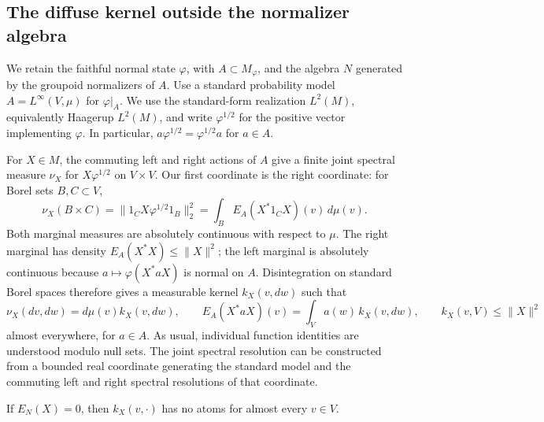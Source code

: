 \subsection{The diffuse kernel outside the normalizer algebra}
We retain the faithful normal state $\varphi$, with $A\subset M_\varphi$,
and the algebra $N$ generated by the groupoid normalizers of $A$.
Use a standard probability model $A=L^\infty(V,\mu)$ for
$\varphi|_A$.  We use the standard-form realization $L^2(M)$, equivalently
Haagerup $L^2(M)$, and write $\varphi^{1/2}$ for the positive vector
implementing $\varphi$.  In particular,
$a\varphi^{1/2}=\varphi^{1/2}a$ for $a\in A$.

For $X\in M$, the commuting left and right actions of $A$ give a finite
joint spectral measure $\nu_X$ for $X\varphi^{1/2}$ on $V\times V$.
Our first coordinate is the right coordinate: for Borel sets $B,C\subset V$,
\begin{equation}\label{exp:joint-measure}
 \nu_X(B\times C)
 =\big\|1_CX\varphi^{1/2}1_B\big\|_2^2
 =\int_B E_A(X^*1_CX)(v)\,d\mu(v).
\end{equation}
Both marginal measures are absolutely continuous with respect to $\mu$.
The right marginal has density $E_A(X^*X)\leq\|X\|^2$; the left marginal
is absolutely continuous because $a\mapsto\varphi(X^*aX)$ is normal on
$A$.  Disintegration on standard Borel spaces therefore gives a measurable
kernel $k_X(v,dw)$ such that
\begin{equation}\label{exp:kernel}
 \nu_X(dv,dw)=d\mu(v)k_X(v,dw),\qquad
 E_A(X^*aX)(v)=\int_V a(w)\,k_X(v,dw),\qquad
 k_X(v,V)\leq\|X\|^2
\end{equation}
almost everywhere, for $a\in A$.  As usual, individual function identities
are understood modulo null sets.  The joint spectral resolution can be
constructed from a bounded real coordinate generating the standard model
and the commuting left and right spectral resolutions of that coordinate.

\begin{lemma}\label{lem:atomless}
 If $E_N(X)=0$, then $k_X(v,\cdot)$ has no atoms for almost every $v\in V$.
\end{lemma}

